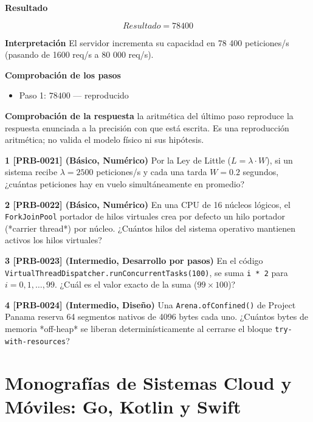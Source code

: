 \documentclass{book}
\begin{document}
\begin{tcolorbox}[title={Problema resuelto}, studiumworked, breakable]
\noindent\textbf{Resultado}

\[
Resultado = 78400
\]

\noindent\textbf{Interpretación}
El servidor incrementa su capacidad en 78 400 peticiones/s (pasando de 1600 req/s a 80 000 req/s).

\noindent\textbf{Comprobación de los pasos}
\begin{itemize}
\item Paso 1: $78400$ — reproducido
\end{itemize}

\noindent\textbf{Comprobación de la respuesta} la aritmética del último paso reproduce la respuesta enunciada a la precisión con que está escrita. Es una reproducción aritmética; no valida el modelo físico ni sus hipótesis.
\end{tcolorbox}

\begin{tcolorbox}[title={Ejercicios}, studiumworked, breakable]

\noindent\textbf{1 [PRB-0021] (Básico, Numérico)}
Por la Ley de Little (\(L = \lambda \cdot W\)), si un sistema recibe \(\lambda = 2500\) peticiones/s y cada una tarda \(W = 0.2\) segundos, ¿cuántas peticiones hay en vuelo simultáneamente en promedio?

\noindent\textbf{2 [PRB-0022] (Básico, Numérico)}
En una CPU de 16 núcleos lógicos, el \texttt{ForkJoinPool} portador de hilos virtuales crea por defecto un hilo portador (*carrier thread*) por núcleo. ¿Cuántos hilos del sistema operativo mantienen activos los hilos virtuales?

\noindent\textbf{3 [PRB-0023] (Intermedio, Desarrollo por pasos)}
En el código \texttt{VirtualThreadDispatcher.runConcurrentTasks(100)}, se suma \texttt{i * 2} para \(i = 0, 1, \dots, 99\). ¿Cuál es el valor exacto de la suma (\(99 \times 100\))?

\noindent\textbf{4 [PRB-0024] (Intermedio, Diseño)}
Una \texttt{Arena.ofConfined()} de Project Panama reserva 64 segmentos nativos de 4096 bytes cada uno. ¿Cuántos bytes de memoria *off-heap* se liberan determinísticamente al cerrarse el bloque \texttt{try-with-resources}?
\end{tcolorbox}

\part{Monografías de Sistemas Cloud y Móviles: Go, Kotlin y Swift}
\end{document}
